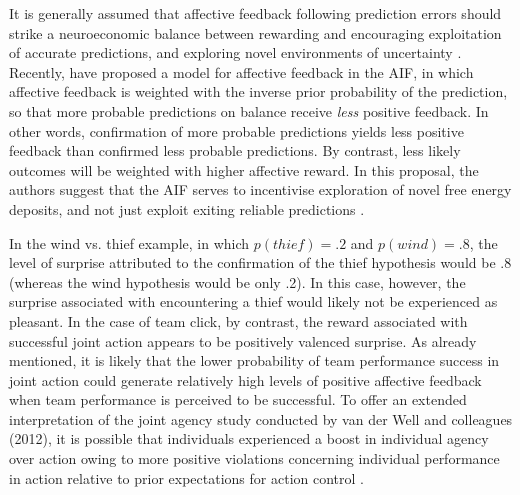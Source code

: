 \begin{CJK}{UTF8}{gbsn}
It is generally assumed that affective feedback following prediction errors should strike a neuroeconomic balance between rewarding and encouraging exploitation of accurate predictions, and exploring novel environments of uncertainty \citep{Chetverikov2014}.  Recently, \textcite{Chetverikov2016} have proposed a model for affective feedback in the AIF, in which affective feedback is weighted with the inverse prior probability of the prediction, so that more probable predictions on balance receive \textit{less} positive feedback.  In other words, confirmation of more probable predictions yields less positive feedback than confirmed less probable predictions.  By contrast, less likely outcomes will be weighted with higher affective reward.  In this proposal, the authors suggest that the AIF serves to incentivise exploration of novel free energy deposits, and not just exploit exiting reliable predictions \citep[thus proposing a dynamical solution to the ``dark room dilemma'' associated with traditional (non-dynamical) models theories of prediction error management;][]{Friston2012}.

In the wind vs. thief example, in which $p(thief)=.2$ and $p(wind)=.8$, the level of surprise attributed to the confirmation of the thief hypothesis would be .8 (whereas the wind hypothesis would be only .2). In this case, however, the surprise associated with encountering a thief would likely not be experienced as pleasant. In the case of team click, by contrast, the reward associated with successful joint action appears to be positively valenced surprise. As already mentioned, it is likely that the lower probability of team performance success in joint action could generate relatively high levels of positive affective feedback when team performance is perceived to be successful. To offer an extended interpretation of the joint agency study conducted by van der Well and colleagues (2012), it is possible that individuals experienced a boost in individual agency over action owing to more positive violations concerning individual performance in action relative to prior expectations for action control \citep[developed in the previous task in the experiment, in which their control over action was shared with another participant;][1277]{VanderWel2012}.





\end{CJK}
